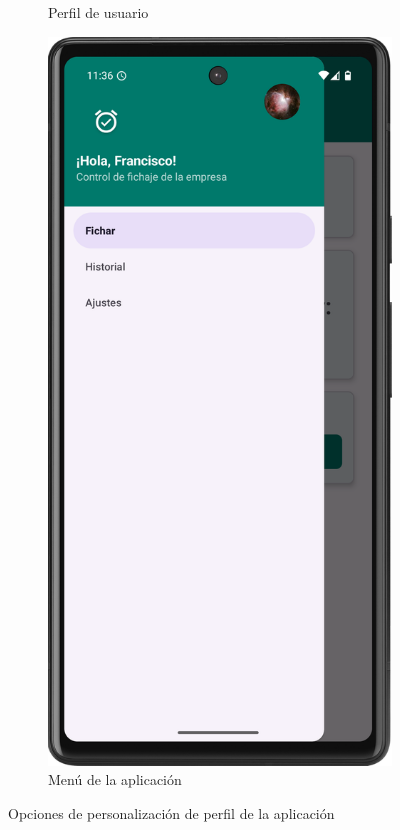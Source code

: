 \begin{figure}[H]
\begin{subfigure}[b]{0.4\textwidth}
         \caption{Perfil de usuario}
         \label{fig:perfil}
     \end{subfigure}
     \hfill
     \begin{subfigure}[b]{0.4\textwidth}
         \centering
         \includegraphics[width=\textwidth]{root/menu.png}
         \caption{Menú de la aplicación}
         \label{fig:menu}
     \end{subfigure}
        \caption{Opciones de personalización de perfil de la aplicación}
        \label{fig:perfiles}
\end{figure}

